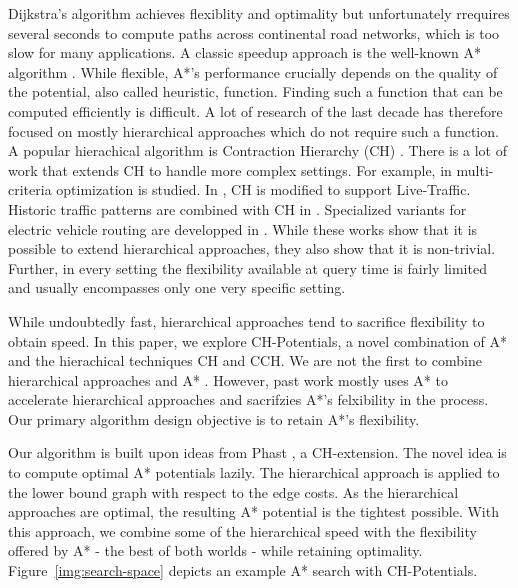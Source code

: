 \documentclass[sigconf]{acmart}
\begin{document}
Dijkstra's algorithm \cite{d-ntpcg-59} achieves flexiblity and optimality but unfortunately rrequires several seconds to compute paths across continental road networks, which is too slow for many applications.
A classic speedup approach is the well-known A* algorithm \cite{hnr-afbhd-68}.
While flexible, A*'s performance crucially depends on the quality of the potential, also called heuristic, function.
Finding such a function that can be computed efficiently is difficult.
A lot of research of the last decade has therefore focused on mostly hierarchical approaches \cite{gssv-erlrn-12,dsw-cch-15,dgpw-crprn-13,ss-ehh-12} which do not require such a function.
A popular hierachical algorithm is Contraction Hierarchy (CH) \cite{gssv-erlrn-12}.
There is a lot of work that extends CH to handle more complex settings.
For example, in \cite{fns-opca-14,gks-rpfof-10} multi-criteria optimization is studied.
In \cite{dsw-cch-15}, CH is modified to support Live-Traffic.
Historic traffic patterns are combined with CH in \cite{swz-sfert-19,bgsv-mtdtt-13,bdpw-dtdrp-16}.
Specialized variants for electric vehicle routing are developped in \cite{bdgwz-sfpcs-19}.
While these works show that it is possible to extend hierarchical approaches, they also show that it is non-trivial.
Further, in every setting the flexibility available at query time is fairly limited and usually encompasses only one very specific setting.

While undoubtedly fast, hierarchical approaches tend to sacrifice flexibility to obtain speed.
In this paper, we explore CH-Potentials, a novel combination of A* and the hierachical techniques CH and CCH.
We are not the first to combine hierarchical approaches and A* \cite{bdsssw-chgds-10, gkw-blwr-07, bdgwz-sfpcs-19}.
However, past work mostly uses A* to accelerate hierarchical approaches and sacrifzies A*'s felxibility in the process.
Our primary algorithm design objective is to retain A*'s flexibility.

Our algorithm is built upon ideas from Phast \cite{dgnw-phast-13}, a CH-extension.
The novel idea is to compute optimal A* potentials lazily.
The hierarchical approach is applied to the lower bound graph with respect to the edge costs.
As the hierarchical approaches are optimal, the resulting A* potential is the tightest possible.
With this approach, we combine some of the hierarchical speed with the flexibility offered by A* - the best of both worlds - while retaining optimality.
Figure~\ref{img:search-space} depicts an example A* search with CH-Potentials.
\end{document}

